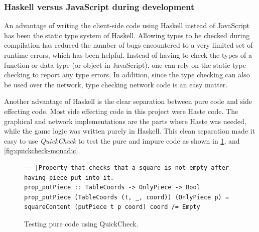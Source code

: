\documentclass[a4paper]{article}
\begin{document}
\subsubsection{Haskell versus JavaScript during development}
An advantage of writing the client-side code using Haskell instead of JavaScript has been the static type system of Haskell. Allowing types to be checked during compilation has reduced the number of bugs encountered to a very limited set of runtime errors, which has been helpful. Instead of having to check the types of a function or data type (or object in JavaScript), one can rely on the static type checking to report any type errors. In addition, since the type checking can also be used over the network, type checking network code is an easy matter.

Another advantage of Haskell is the clear separation between pure code and side effecting code. Most side effecting code in this project were Haste code. The graphical and network implementations are the parts where Haste was needed, while the game logic was written purely in Haskell. This clean separation made it easy to use \textit{QuickCheck} to test the pure and impure code as shown in \cref{fig:quickchecking}, and \cref{fig:quickcheck-monadic}.

\begin{figure}[h!]
    \begin{lstlisting}
-- |Property that checks that a square is not empty after having piece put into it.
prop_putPiece :: TableCoords -> OnlyPiece -> Bool
prop_putPiece (TableCoords (t, _, coord)) (OnlyPiece p) = squareContent (putPiece t p coord) coord /= Empty
    \end{lstlisting}
    \caption{Testing pure code using QuickCheck.}
    \label{fig:quickchecking}
\end{figure}    
\end{document}

